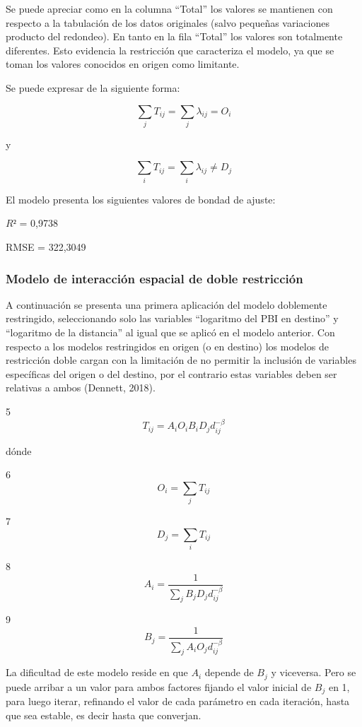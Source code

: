 \documentclass[12pt,spanish,]{article}
\begin{document}
\newpage
\begin{landscape}

\end{landscape}

Se puede apreciar como en la columna ``Total'' los valores se mantienen
con respecto a la tabulación de los datos originales (salvo pequeñas
variaciones producto del redondeo). En tanto en la fila ``Total'' los
valores son totalmente diferentes. Esto evidencia la restricción que
caracteriza el modelo, ya que se toman los valores conocidos en origen
como limitante.

Se puede expresar de la siguiente forma:

\[\sum_{j}T_{ij} = \sum_{j}\lambda_{ij} = O_{i}\]

y

\[\sum_{i}T_{ij} = \sum_{i}\lambda_{ij} \neq D_{j}\]

El modelo presenta los siguientes valores de bondad de ajuste:

\(R²\) = 0,9738

RMSE = 322,3049

\hypertarget{modelo-de-interacciuxf3n-espacial-de-doble-restricciuxf3n}{%
\subsubsection{Modelo de interacción espacial de doble
restricción}\label{modelo-de-interacciuxf3n-espacial-de-doble-restricciuxf3n}}

A continuación se presenta una primera aplicación del modelo doblemente
restringido, seleccionando solo las variables ``logaritmo del PBI en
destino'' y ``logaritmo de la distancia'' al igual que se aplicó en el
modelo anterior. Con respecto a los modelos restringidos en origen (o en
destino) los modelos de restricción doble cargan con la limitación de no
permitir la inclusión de variables específicas del origen o del destino,
por el contrario estas variables deben ser relativas a ambos (Dennett,
2018).

5 \[T_{ij} = A_{i}O_{i}B_{i}D_{j}d_{ij}^{-\beta }\]

dónde

6 \[O_{i} = \sum_{j}T_{ij}\]

7 \[D_{j} = \sum_{i}T_{ij}\]

8 \[A_{i} = \frac{1}{\sum_{j}B_{j}D_{j}d_{ij}^{-\beta}}\]

9 \[B_{j} = \frac{1}{\sum_{j}A_{i}O_{j}d_{ij}^{-\beta}}\]

La dificultad de este modelo reside en que \(A_{i}\) depende de
\(B_{j}\) y viceversa. Pero se puede arribar a un valor para ambos
factores fijando el valor inicial de \(B_{j}\) en 1, para luego iterar,
refinando el valor de cada parámetro en cada iteración, hasta que sea
estable, es decir hasta que converjan.
\end{document}
